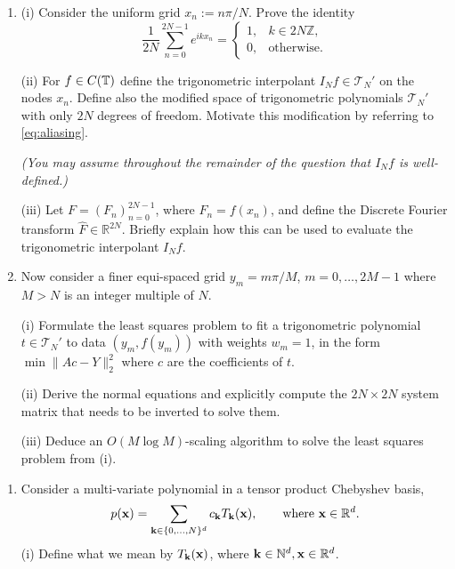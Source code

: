 \documentclass{exams}
\newcommand{\R}{\mathbb{R}}
\newcommand{\Z}{\mathbb{Z}}
\begin{document}
\begin{examcomp1}
\begin{question}
\begin{enumerate}
  \item (i) Consider the uniform grid $x_n := n \pi / N$. Prove the identity  
  \begin{equation}\label{eq:aliasing}
      \frac{1}{2N} \sum_{n = 0}^{2N-1} e^{i k x_n} = 
      \begin{cases}
          1, & k \in 2N \Z, \\ 
          0, & \text{otherwise}.
      \end{cases}
  \end{equation}
  
  (ii) For $f \in C(\mathbb{T})$ define the trigonometric interpolant $I_N f \in
  \mathcal{T}_N'$ on the nodes $x_n$. Define also the modified space of
  trigonometric polynomials $\mathcal{T}_N'$ with only $2N$ degrees of freedom.
  Motivate this modification by referring to \eqref{eq:aliasing}.

  {\it (You may assume throughout the remainder of the question that $I_N f$ is
  well-defined.)}

  (iii) Let $F = (F_n)_{n = 0}^{2N-1}$, where $F_n = f(x_n)$, and define the
  Discrete Fourier transform  $\hat{F} \in \R^{2N}$. Briefly explain how this can be
  used to evaluate the trigonometric interpolant $I_N f$.  
  
  \item Now consider a finer equi-spaced grid $y_m = m \pi / M$, $m = 0, \dots,
  2M-1$ where $M > N$ is an integer multiple of $N$.

  (i) Formulate the least squares problem to fit a trigonometric polynomial $t
  \in \mathcal{T}_N'$ to data $(y_m, f(y_m))$ with weights $w_m = 1$, in the
  form $\min \|A c - Y \|_2^2$ where $c$ are the coefficients of $t$.

  (ii) Derive the normal equations and explicitly
  compute the $2N \times 2N$ system matrix that needs to be inverted to solve
  them. 

  (iii) Deduce an $O(M \log M)$-scaling algorithm to solve the least squares
  problem from (i). 
  \end{enumerate}
\end{question}

\clearpage

\begin{question}
  \begin{enumerate}

  \item Consider a multi-variate polynomial in a tensor 
  product Chebyshev basis, 
  \[
      p({\bf x}) = \sum_{{\bf k} \in \{0,\dots,N\}^d} c_{\bf k} T_{\bf k}({\bf x}), 
      \qquad \text{where } {\bf x} \in \R^d.
  \]
  (i) Define what we mean by $T_{\bf k}({\bf x})$, where 
  ${\bf k} \in \mathbb{N}^d, {\bf x} \in \R^d$.  
  

\end{enumerate}
\end{question}
\end{examcomp1}
\end{document}

